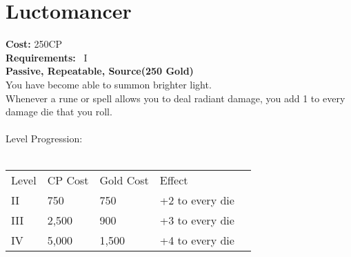 \section{Luctomancer}\label{perk:luctomancer}
\textbf{Cost:} 250CP\\
\textbf{Requirements:}~ I\\
\textbf{Passive, Repeatable, Source(250 Gold)}\\
You have become able to summon brighter light.\\
Whenever a rune or spell allows you to deal radiant damage, you add 1 to every damage die that you roll.\\
\\
Level Progression:\\
\\
\begin{tabular}{l | l | l | l | l}
    Level & CP Cost & Gold Cost &  Effect\\
    II & 750 & 750 & +2 to every die\\
    III & 2,500 & 900 & +3 to every die\\
    IV & 5,000 & 1,500 & +4 to every die\\
\end{tabular}